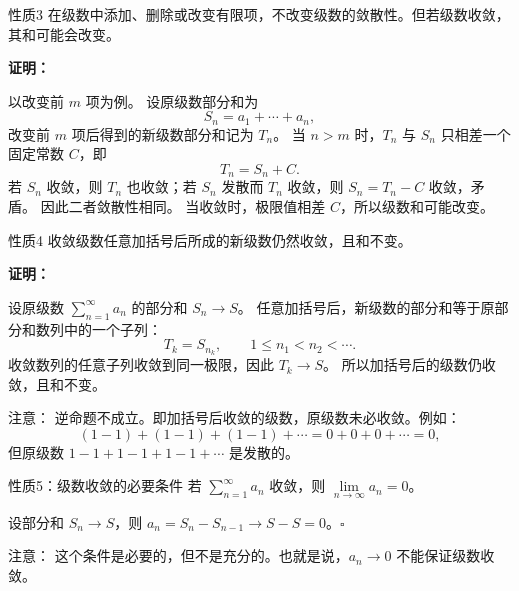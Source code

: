\documentclass[aspectratio=169,10pt]{ctexbeamer}
\begin{document}
\begin{frame}
	\begin{block}{性质3}
		在级数中添加、删除或改变有限项，不改变级数的敛散性。但若级数收敛，其和可能会改变。
	\end{block}
	\vspace{0.7cm}
	\textbf{证明：}
	
	以改变前 $m$ 项为例。 设原级数部分和为
	\[
	S_n=a_1+\cdots+a_n,
	\]
	改变前 $m$ 项后得到的新级数部分和记为 $T_n$。 当 $n>m$ 时，$T_n$ 与 $S_n$ 只相差一个固定常数 $C$，即
	\[
	T_n=S_n+C.
	\]
	若 $S_n$ 收敛，则 $T_n$ 也收敛；若 $S_n$ 发散而 $T_n$ 收敛，则 $S_n=T_n-C$ 收敛，矛盾。 因此二者敛散性相同。 当收敛时，极限值相差 $C$，所以级数和可能改变。
	
\end{frame}

\begin{frame}
	\begin{block}{性质4}
		收敛级数任意加括号后所成的新级数仍然收敛，且和不变。
		
		
	\end{block}
	\vspace{0.25cm}
	
	\textbf{证明：}
	
	设原级数 $\sum\limits_{n = 1}^{  \infty } a_n$ 的部分和 $S_n\to S$。 任意加括号后，新级数的部分和等于原部分和数列中的一个子列：
	\[
	T_k=S_{n_k},\qquad 1\le n_1<n_2<\cdots .
	\]
	收敛数列的任意子列收敛到同一极限，因此 $T_k\to S$。 所以加括号后的级数仍收敛，且和不变。 
	\vspace{0.25cm}
	
	\begin{alertblock}{注意：}
		 逆命题不成立。即加括号后收敛的级数，原级数未必收敛。例如：
		\[
		(1-1)+(1-1)+(1-1)+\cdots = 0+0+0+\cdots = 0,
		\]
		但原级数 \(1-1+1-1+1-1+\cdots\) 是发散的。
	\end{alertblock}
	
\end{frame}


\begin{frame}
	\begin{block}{性质5：级数收敛的必要条件}
		若 \(\sum\limits_{n = 1}^{  \infty } a_n\) 收敛，则 \(\lim\limits_{n \to \infty} a_n = 0\)。
	\end{block}
	\vspace{0.8cm}
	
	
	设部分和 \(S_n \to S\)，则 \(a_n = S_n - S_{n-1} \to S - S = 0\)。\(\square\)
	\vspace{0.8cm}
	\begin{alertblock}{注意：}
		这个条件是必要的，但不是充分的。也就是说，\(a_n \to 0\) 不能保证级数收敛。
	\end{alertblock}
\end{frame}
\end{document}
